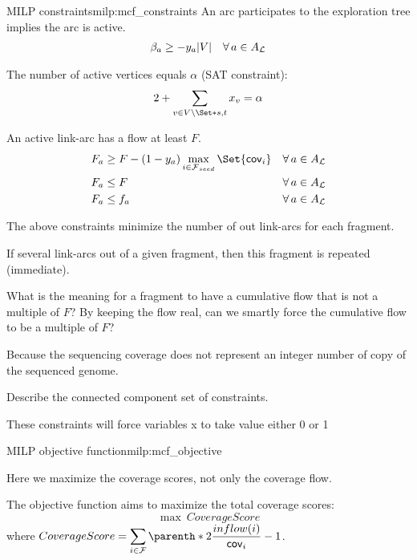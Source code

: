 \begin{definition}{\MCF{} MILP constraints}{milp:mcf_constraints}
  An arc participates to the exploration tree implies the arc is active.
  \begin{align}
    \beta_a \geq - y_a |V| \quad \forall a \in A_\Links{}
  \end{align}

  The number of active vertices equals \(\alpha{}\) (SAT constraint):
  \begin{align}
    2 + \sum_{v \in V \setminus \Set*{s, t}} x_v = \alpha
  \end{align}

  An active link-arc has a flow at least \(F\).
  \begin{align}
    F_a & \geq F - (1 - y_a) \max_{i \in \SeedFrags{}}\Set{\cov{i}} & \forall a \in A_\Links{} \\
    F_a & \leq F & \forall a \in A_\Links{} \\
    F_a & \leq f_a & \forall a \in A_\Links{} \label{const:arc_flow_at_least_total_flow}
  \end{align}
  \begin{infobox}
    The above constraints minimize the number of out link-arcs for each fragment.
  \end{infobox}
  \begin{missingproofbox}
    If several link-arcs out of a given fragment,
    then this fragment is repeated (immediate).
  \end{missingproofbox}
  \begin{questionbox}
    What is the meaning for a fragment to have a cumulative flow that is not a multiple of \(F\)?
    By keeping the flow real, can we smartly force the cumulative flow to be a multiple of \(F\)?

    \begin{notebox}
      Because the sequencing coverage does not represent an integer number of copy of the sequenced genome.
    \end{notebox}
  \end{questionbox}

  \begin{todobox}
    Describe the connected component set of constraints.
    \begin{notebox}
      These constraints will force variables x to take value either 0 or 1
    \end{notebox}
  \end{todobox}
\end{definition}

\begin{definition}{\MCF{} MILP objective function}{milp:mcf_objective}
  \begin{newfeatbox}
    Here we maximize the coverage scores, not only the coverage flow.
  \end{newfeatbox}
  The objective function aims to maximize the total coverage scores:
  \begin{equation}
    \max ~ CoverageScore
  \end{equation}
  where \(
    \displaystyle CoverageScore = %
    \sum_{i \in \Fragments{}} \parenth*{2 \frac{inflow(i)}{\cov{i}} - 1}
  \).
\end{definition}